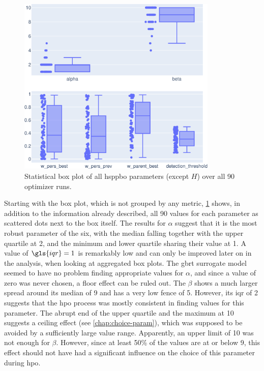 \begin{figure}[h]
	\centering
	\includegraphics[width=0.85\textwidth]{results/part2/parameter_boxplot_None.svg}
	\caption[Statistical box plot of \gls{hsppbo} parameters]{Statistical box plot of all \gls{hsppbo} parameters (except $H$) over all 90 optimizer runs.}
	\label{fig:parameter_boxplot}
\end{figure}

Starting with the box plot, which is not grouped by any metric, \cref{fig:parameter_boxplot} shows, in addition to the information already described, all 90 values for each parameter as scattered dots next to the box itself. The results for $\alpha$ suggest that it is the most robust parameter of the six, with the median falling together with the upper quartile at 2, and the minimum and lower quartile sharing their value at 1. A value of $\gls{iqr} = 1$ is remarkably low and can only be improved later on in the analysis, when looking at aggregated box plots. The \gls{gbrt} surrogate model seemed to have no problem finding appropriate values for $\alpha$, and since a value of zero was never chosen, a floor effect can be ruled out. The $\beta$ shows a much larger spread around its median of 9 and has a very low fence of 5. However, its \gls{iqr} of 2 suggests that the \gls{hpo} process was mostly consistent in finding values for this parameter. The abrupt end of the upper quartile and the maximum at 10 suggests a ceiling effect (see \cref{chap:choice-param}), which was supposed to be avoided by a sufficiently large value range. Apparently, an upper limit of 10 was not enough for $\beta$. However, since at least 50\% of the values are at or below 9, this effect should not have had a significant influence on the choice of this parameter during \glsdesc{hpo}. 

